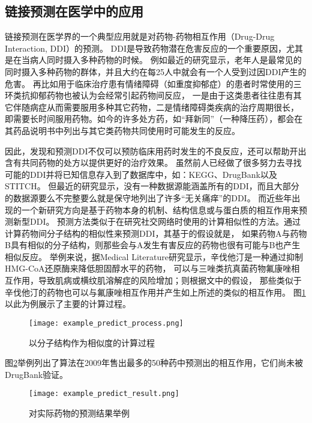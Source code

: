 \subsection{链接预测在医学中的应用}
链接预测在医学界的一个典型应用就是对药物-药物相互作用（Drug-Drug Interaction, DDI）的预测。
DDI是导致药物潜在危害反应的一个重要原因，尤其是在当病人同时摄入多种药物的时候\cite{fokoue2016predicting}。
例如最近的研究显示，老年人是最常见的同时摄入多种药物的群体，并且大约在每25人中就会有一个人受到过因DDI产生的危害\cite{huang2013systematic}\cite{juurlink2003drug}。
再比如用于临床治疗患有情绪障碍（如重度抑郁症）的患者时常使用的三环类抗抑郁药物也被认为会经常引起药物间反应，
一是由于这类患者往往患有其它伴随病症从而需要服用多种其它药物，二是情绪障碍类疾病的治疗周期很长，
即需要长时间服用药物。如今的许多处方药，如“拜新同”（一种降压药），都会在其药品说明书中列出与其它类药物共同使用时可能发生的反应。

因此，发现和预测DDI不仅可以预防临床用药时发生的不良反应，还可以帮助开出含有共同药物的处方以提供更好的治疗效果\cite{zhang2018prioritizing}。
虽然前人已经做了很多努力去寻找可能的DDI并将已知信息存入到了数据库中，如：KEGG、DrugBank以及STITCH。
但最近的研究显示，没有一种数据源能涵盖所有的DDI，而且大部分的数据源要么不完整要么就是保守地列出了许多“无关痛痒”的DDI\cite{fokoue2016predicting}。
而近些年出现的一个新研究方向是基于药物本身的机制、结构信息或与蛋白质的相互作用来预测新型DDI。
预测方法类似于在研究社交网络时使用的计算相似性的方法。\cite{vilar2012drug}通过计算药物间分子结构的相似性来预测DDI，其基于的假设就是，
如果药物A与药物B具有相似的分子结构，则那些会与A发生有害反应的药物也很有可能与B也产生相似反应。
举例来说，据Medical Literature研究显示，辛伐他汀是一种通过抑制HMG-CoA还原酶来降低胆固醇水平的药物，
可以与三唑类抗真菌药物氟康唑相互作用，导致肌病或横纹肌溶解症的风险增加；则根据文中的假设，
那些类似于辛伐他汀的药物也可以与氟康唑相互作用并产生如上所述的类似的相互作用。
图\ref{intro:fig:process}以此为例展示了主要的计算过程。

\begin{figure} 
  \centering
  \texttt{[image: example\_predict\_process.png]}
  \caption{以分子结构作为相似度的计算过程\cite{vilar2012drug}}
  \label{intro:fig:process}
\end{figure} 

图\ref{intro:fig:result}举例列出了算法在2009年售出最多的50种药中预测出的相互作用，它们尚未被DrugBank验证。

\begin{figure} 
  \centering
  \texttt{[image: example\_predict\_result.png]}
  \caption{对实际药物的预测结果举例\cite{vilar2012drug}}
  \label{intro:fig:result}
\end{figure} 

